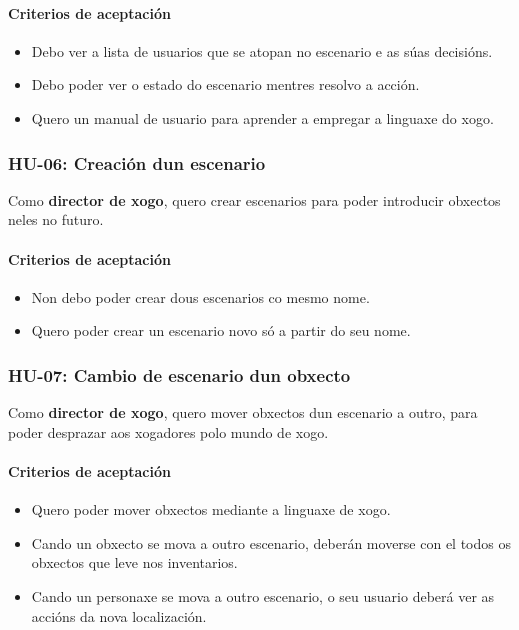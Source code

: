 \paragraph{Criterios de aceptación}
\begin{itemize}
  \item Debo ver a lista de usuarios que se atopan no escenario e as súas
  decisións.
  \item Debo poder ver o estado do escenario mentres resolvo a acción.
  \item Quero un manual de usuario para aprender a empregar a linguaxe do xogo.
\end{itemize}

\subsubsection{HU-06: Creación dun escenario}
Como \textbf{director de xogo}, quero crear escenarios para poder introducir
obxectos neles no futuro.
\paragraph{Criterios de aceptación}
\begin{itemize}
  \item Non debo poder crear dous escenarios co mesmo nome.
  \item Quero poder crear un escenario novo só a partir do seu nome.
\end{itemize}

\subsubsection{HU-07: Cambio de escenario dun obxecto}
Como \textbf{director de xogo}, quero mover obxectos dun escenario a outro, para
poder desprazar aos xogadores polo mundo de xogo.
\paragraph{Criterios de aceptación}
\begin{itemize}
  \item Quero poder mover obxectos mediante a linguaxe de xogo.
  \item Cando un obxecto se mova a outro escenario, deberán moverse con el todos
  os obxectos que leve nos inventarios.
  \item Cando un personaxe se mova a outro escenario, o seu usuario deberá ver
  as accións da nova localización.
\end{itemize}


